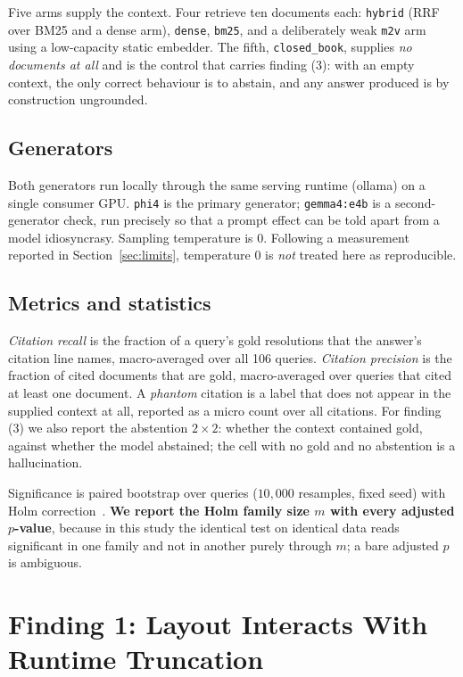 \documentclass[conference]{IEEEtran}
\begin{document}
Five arms supply the context. Four retrieve ten documents each: \texttt{hybrid}
(RRF over BM25 and a dense arm), \texttt{dense}, \texttt{bm25}, and a
deliberately weak \texttt{m2v} arm using a low-capacity static embedder. The
fifth, \texttt{closed\_book}, supplies \emph{no documents at all} and is the
control that carries finding (3): with an empty context, the only correct
behaviour is to abstain, and any answer produced is by construction ungrounded.

\subsection{Generators}

Both generators run locally through the same serving runtime (ollama) on a single
consumer GPU. \texttt{phi4} is the primary generator; \texttt{gemma4:e4b} is a
second-generator check, run precisely so that a prompt effect can be told apart
from a model idiosyncrasy. Sampling temperature is 0. Following a measurement
reported in Section~\ref{sec:limits}, temperature 0 is \emph{not} treated here as
reproducible.

\subsection{Metrics and statistics}

\emph{Citation recall} is the fraction of a query's gold resolutions that the
answer's citation line names, macro-averaged over all 106 queries.
\emph{Citation precision} is the fraction of cited documents that are gold,
macro-averaged over queries that cited at least one document. A \emph{phantom}
citation is a label that does not appear in the supplied context at all, reported
as a micro count over all citations. For finding (3) we also report the
abstention $2\times2$: whether the context contained gold, against whether the
model abstained; the cell with no gold and no abstention is a hallucination.

Significance is paired bootstrap over queries ($10{,}000$ resamples, fixed seed)
with Holm correction~\cite{holm1979}. \textbf{We report the Holm family size $m$
with every adjusted $p$-value}, because in this study the identical test on
identical data reads significant in one family and not in another purely through
$m$; a bare adjusted $p$ is ambiguous.

\section{Finding 1: Layout Interacts With Runtime Truncation}
\end{document}
